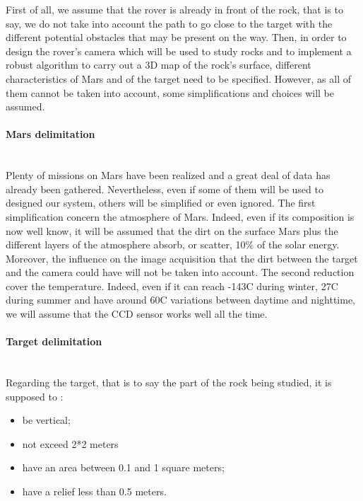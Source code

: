 First of all, we assume that the rover is already in front of the rock, that is to say, we do not take into account the path to go close to the target with the different potential obstacles that may be present on the way. Then, in order to design the rover's camera which will be used to study rocks and to implement a robust algorithm to carry out a 3D map of the rock's surface, different characteristics of Mars and of the target need to be specified. However, as all of them cannot be taken into account, some simplifications and choices will be assumed.

\paragraph*{Mars delimitation}
~\\
Plenty of missions on Mars have been realized and a great deal of data has already been gathered. Nevertheless, even if some of them will be used to designed our system, others will be simplified or even ignored.
The first simplification concern the atmosphere of Mars. Indeed, even if its composition is now well know, it will be assumed that the dirt on the surface Mars plus the different layers of the atmosphere absorb, or scatter, 10\% of the solar energy. Moreover, the influence on the image acquisition that the dirt between the target and the camera could have will not be taken into account.
The second reduction cover the temperature. Indeed, even if it can reach -143\textdegree C during winter, 27\textdegree C during summer and have around 60\textdegree C variations between daytime and nighttime\cite{wiki:temperature}, we will assume that the CCD sensor works well all the time.


\paragraph*{Target delimitation}
~\\
Regarding the target, that is to say the part of the rock being studied, it is supposed to :
\begin{itemize}
\item be vertical;
\item not exceed 2*2 meters
\item have an area between 0.1 and 1 square meters;
\item have a relief less than 0.5 meters.
\end{itemize}

